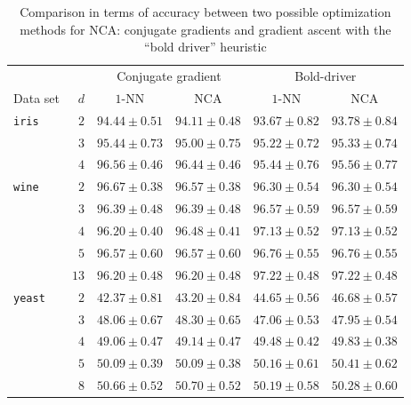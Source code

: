 \begin{landscape}
  \begin{table}
  \centering
    \begin{tabular}{lrcccc}
    \toprule
	    &     & \multicolumn{2}{c}{Conjugate gradient}  & \multicolumn{2}{c}{Bold-driver}\\
    \cmidrule(r){3-4} \cmidrule(r){5-6}
    Data set & $d$ & $1$-NN & NCA & $1$-NN & NCA \\
    \midrule
      \texttt{iris}&$2$&$94.44 \pm 0.51$&$94.11 \pm 0.48$&$93.67 \pm 0.82$&$93.78 \pm 0.84$\\ 
      &$3$&$95.44 \pm 0.73$&$95.00 \pm 0.75$&$95.22 \pm 0.72$&$95.33 \pm 0.74$\\ 
      &$4$&$96.56 \pm 0.46$&$96.44 \pm 0.46$&$95.44 \pm 0.76$&$95.56 \pm 0.77$\\ 
      \midrule
      \texttt{wine}&$2$&$96.67 \pm 0.38$&$96.57 \pm 0.38$&$96.30 \pm 0.54$&$96.30 \pm 0.54$\\ 
      &$3$&$96.39 \pm 0.48$&$96.39 \pm 0.48$&$96.57 \pm 0.59$&$96.57 \pm 0.59$\\ 
      &$4$&$96.20 \pm 0.40$&$96.48 \pm 0.41$&$97.13 \pm 0.52$&$97.13 \pm 0.52$\\ 
      &$5$&$96.57 \pm 0.60$&$96.57 \pm 0.60$&$96.76 \pm 0.55$&$96.76 \pm 0.55$\\ 
      &$13$&$96.20 \pm 0.48$&$96.20 \pm 0.48$&$97.22 \pm 0.48$&$97.22 \pm 0.48$\\ 
      \midrule
      \texttt{yeast}&$2$&$42.37 \pm 0.81$&$43.20 \pm 0.84$&$44.65 \pm 0.56$&$46.68 \pm 0.57$\\ 
      &$3$&$48.06 \pm 0.67$&$48.30 \pm 0.65$&$47.06 \pm 0.53$&$47.95 \pm 0.54$\\ 
      &$4$&$49.06 \pm 0.47$&$49.14 \pm 0.47$&$49.48 \pm 0.42$&$49.83 \pm 0.38$\\ 
      &$5$&$50.09 \pm 0.39$&$50.09 \pm 0.38$&$50.16 \pm 0.61$&$50.41 \pm 0.62$\\ 
      &$8$&$50.66 \pm 0.52$&$50.70 \pm 0.52$&$50.19 \pm 0.58$&$50.28 \pm 0.60$\\ 
    \bottomrule
    \end{tabular}
  \caption{Comparison in terms of accuracy between two possible optimization methods for NCA: conjugate gradients and gradient ascent with the ``bold driver'' heuristic}
  \label{table:comp-opts-2}
  \end{table}


\end{landscape}
